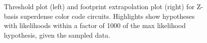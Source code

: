 \documentclass[onecolumn,unpublished,a4paper]{quantumarticle}
\theoremstyle{definition}
\theoremstyle{definition}
\theoremstyle{definition}
\begin{document}
\begin{figure}
    \centering
    \hfill
    \caption{
        Threshold plot (left) and footprint extrapolation plot (right) for Z-basis superdense color code circuits.
        Highlights show hypotheses with likelihoods within a factor of 1000 of the max likelihood hypothesis, given the sampled data.
    }
    \label{fig:superdense-z}
\end{figure}
\end{document}
